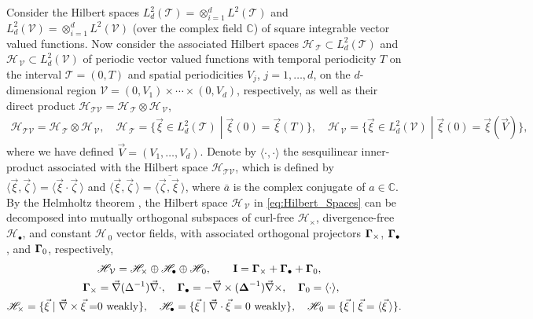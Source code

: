 \documentclass[11pt]{amsart}
\newcommand{\Ib}{\mathbf{I}}
\newcommand{\Tc}{\mathcal{T}}
\newcommand{\Vc}{\mathcal{V}}
\newcommand{\Hs}{\mathscr{H}}
\newcommand\bDelta{\mbox{\boldmath${\Delta}$}}
\newcommand\bGamma{\mbox{\boldmath${\Gamma}$}}
\begin{document}
Consider the Hilbert spaces $L^2_d(\Tc)=\otimes_{i=1}^dL^2(\Tc)$ and
$L^2_d(\Vc)=\otimes_{i=1}^dL^2(\Vc)$ (over the complex field $\mathbb{C}$) of 
square integrable vector valued functions. Now consider the associated
Hilbert spaces $\Hs_{\,\Tc}\subset L^2_d(\Tc)$ and $\Hs_{\,\Vc}\subset L^2_d(\Vc)$
of periodic vector valued functions with temporal periodicity $T$ on
the interval $\Tc=(0,T)$ and spatial periodicities $V_j$, $j=1,\ldots,d$,
on the $d$-dimensional region $\Vc=(0,V_1)\times\cdots\times(0,V_d)$, respectively,
as well as their direct product
$\Hs_{\Tc\Vc}=\Hs_{\,\Tc}\otimes\Hs_{\,\Vc}$,
%
\begin{align}\label{eq:Hilbert_Spaces}
  \Hs_{\Tc\Vc}=\Hs_{\,\Tc}\otimes\Hs_{\,\Vc}, \quad
  \Hs_{\,\Tc}=\{ 
     \vec{\xi}\in L^2_d(\Tc)\;|\;
     \vec{\xi}(0)=\vec{\xi}(T) 
                        \}, \quad
  \Hs_{\,\Vc}=\{ 
     \vec{\xi}\in L^2_d(\Vc)\;|\;
     \vec{\xi}(0)=\vec{\xi}(\vec{V}) 
                        \}, 
\end{align}
%
where we have defined $\vec{V}=(V_1,\ldots,V_d)$. Denote by $\langle\cdot,\cdot\rangle$ the
sesquilinear inner-product associated with the Hilbert space
$\Hs_{\Tc\Vc}$, which is defined by
$\langle\vec{\xi},\vec{\zeta}\,\rangle=\langle\vec{\xi}\cdot\vec{\zeta}\,\rangle$  and
$\langle\vec{\xi},\vec{\zeta}\,\rangle=\overline{\langle\vec{\zeta},\vec{\xi}\,\rangle}$, where $\bar{a}$ 
is the complex conjugate of $a\in\mathbb{C}$. By the Helmholtz theorem 
\cite{Denaro:2003:0271,Bhatia:IEE:1077}, the 
Hilbert space $\Hs_{\,\Vc}$ in \eqref{eq:Hilbert_Spaces} can be
decomposed into mutually orthogonal subspaces of curl-free $\Hs_\times$,
divergence-free $\Hs_\bullet$, and constant $\Hs_{\,0}$ vector fields, with
associated orthogonal projectors $\bGamma_\times$, $\bGamma_\bullet$, and
$\bGamma_0$, respectively,
\cite{Fannjiang:SIAM_JAM:333,MILTON:2002:TC}    
%
\begin{align}\label{eq:Helmholtz}
  &\Hs_{\,\Vc}=\Hs_\times\oplus\Hs_\bullet\oplus\Hs_{\,0},\qquad
  \Ib=\bGamma_\times+\bGamma_\bullet+\bGamma_0, \\
  \bGamma_\times&=\vec{\nabla}(\Delta^{-1})\vec{\nabla}\cdot, \quad
  \bGamma_\bullet=-\vec{\nabla}\times(\bDelta^{-1})\vec{\nabla}\times, \quad
  \bGamma_0=\langle\cdot\rangle, \quad
  \notag \\
  \Hs_\times=\{\vec{\xi}\;|\;\vec{\nabla}\times\vec{\xi}=&0 \text{ weakly}\}, \quad
  \Hs_\bullet
      =\{\vec{\xi}\;|\;\vec{\nabla}\cdot\vec{\xi}=0 \text{ weakly}\},   \quad
  \Hs_{\,0}
      =\{\vec{\xi}\;|\;\vec{\xi}=\langle\vec{\xi}\,\rangle\}.
     \notag  
\end{align}
%
\end{document}
